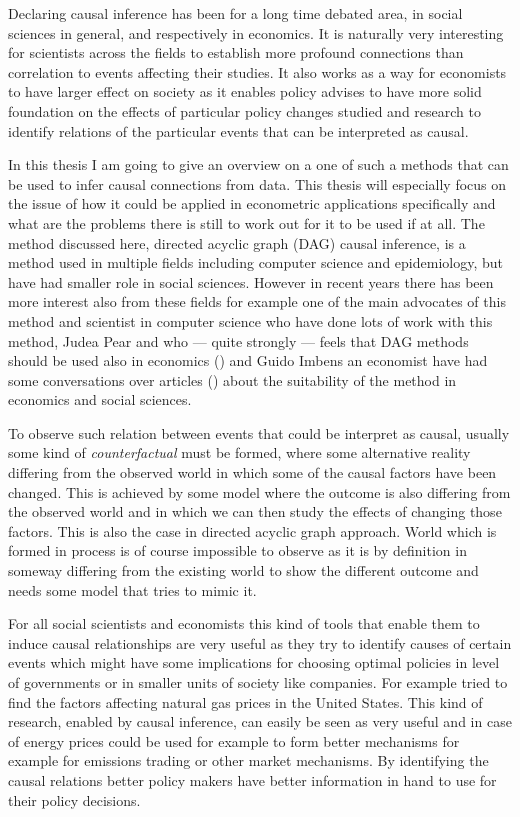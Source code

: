 \documentclass[main=english,12pt,a4paper,pdftex,econ,utf8]{aaltothesis}
\begin{document}
Declaring causal inference has been for a long time debated area, in social sciences in general, and respectively in economics. It is naturally very interesting for scientists across the fields to establish more profound connections than correlation to events affecting their studies. It also works as a way for economists to have larger effect on society as it enables policy advises to have more solid foundation on the effects of particular policy changes studied and research to identify relations of the particular events that can be interpreted as causal.

In this thesis I am going to give an overview on a one of such a methods that can be used to infer causal connections from data. This thesis will especially focus on the issue of how it could be applied in econometric applications specifically and what are the problems there is still to work out for it to be used if at all. The method discussed here, directed acyclic graph (DAG) causal inference, is a method used in multiple fields including computer science and epidemiology, but have had smaller role in social sciences. However in recent years there has been more interest also from these fields for example one of the main advocates of this method and scientist in computer science who have done lots of work with this method, Judea Pear and who --- quite strongly --- feels that DAG methods should be used also in economics (\cite{pearl_2014}) and Guido Imbens an economist have had some conversations over articles (\cite{Imbens2014}) about the suitability of the method in economics and social sciences.

To observe such relation between events that could be interpret as causal, usually some kind of \textit{counterfactual} must be formed, where some alternative reality differing from the observed world in which some of the causal factors have been changed. This is achieved by some model where the outcome is also differing from the observed world and in which we can then study the effects of changing those factors. This is also the case in directed acyclic graph approach. World which is formed in process is of course impossible to observe as it is by definition in someway differing from the existing world to show the different outcome and needs some model that tries to mimic it.

For all social scientists and economists this kind of tools that enable them to induce causal relationships are very useful as they try to identify causes of certain events which might have some implications for choosing optimal policies in level of governments or in smaller units of society like companies. For example \cite{Ji2018} tried to find the factors affecting natural gas prices in the United States. This kind of research, enabled by causal inference, can easily be seen as very useful and in case of energy prices could be used for example to form better mechanisms for example for emissions trading or other market mechanisms. By identifying the causal relations better policy makers have better information in hand to use for their policy decisions. 
\end{document}
